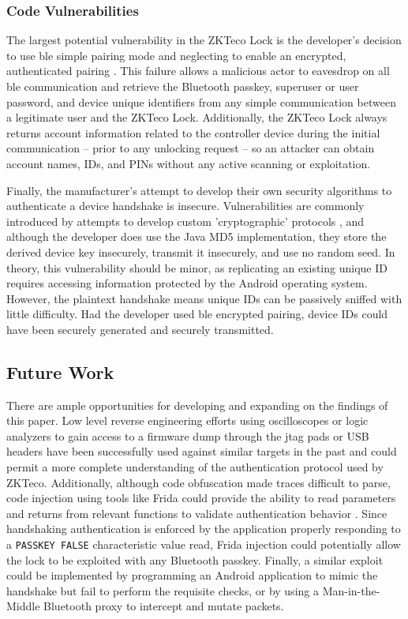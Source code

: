\documentclass[conference]{IEEEtran}
\begin{document}
\bigskip
\subsubsection{Code Vulnerabilities}

The largest potential vulnerability in the ZKTeco Lock is the developer's decision to use \gls{ble} simple pairing mode and neglecting to enable an encrypted, authenticated pairing \cite{Quinn2019}.  This failure allows a malicious actor to eavesdrop on all \gls{ble} communication and retrieve the Bluetooth passkey, superuser or user password, and device unique identifiers from any simple communication between a legitimate user and the ZKTeco Lock.  Additionally, the ZKTeco Lock always returns account information related to the controller device during the initial communication -- prior to any unlocking request -- so an attacker can obtain account names, IDs, and PINs without any active scanning or exploitation.

\bigskip

Finally, the manufacturer's attempt to develop their own security algorithms to authenticate a device handshake is insecure.  Vulnerabilities are commonly introduced by attempts to develop custom 'cryptographic' protocols \cite{Chatzikonstantinou2016}, and although the developer does use the Java MD5 implementation, they store the derived device key insecurely, transmit it insecurely, and use no random seed.  In theory, this vulnerability should be minor, as replicating an existing unique ID requires accessing information protected by the Android operating system.  However, the plaintext handshake means unique IDs can be passively sniffed with little difficulty.  Had the developer used \gls{ble} encrypted pairing, device IDs could have been securely generated \cite{Chatzikonstantinou2016} and securely transmitted.

\subsection{Future Work}

There are ample opportunities for developing and expanding on the findings of this paper.  Low level reverse engineering efforts using oscilloscopes or logic analyzers to gain access to a firmware dump through the \gls{jtag} pads or USB headers have been successfully used against similar targets in the past \cite{REinIoT}\cite{Barcena2015} and could permit a more complete understanding of the authentication protocol used by ZKTeco.  Additionally, although code obfuscation made traces difficult to parse, code injection using tools like Frida could provide the ability to read parameters and returns from relevant functions to validate authentication behavior \cite{NowSecure}.  Since handshaking authentication is enforced by the application properly responding to a \verb|PASSKEY FALSE| characteristic value read, Frida injection could potentially allow the lock to be exploited with any Bluetooth passkey.  Finally, a similar exploit could be implemented by programming an Android application to mimic the handshake but fail to perform the requisite checks, or by using a Man-in-the-Middle Bluetooth proxy to intercept and mutate packets.
\end{document}
